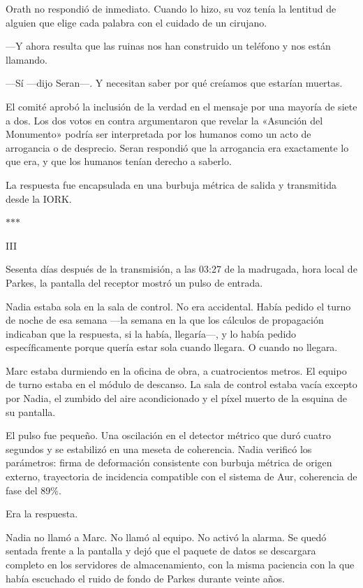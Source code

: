 \documentclass[11pt,a5paper,twoside]{book}
\begin{document}
Orath no respondió de inmediato. Cuando lo hizo, su voz tenía la lentitud de alguien que elige cada palabra con el cuidado de un cirujano.

—Y ahora resulta que las ruinas nos han construido un teléfono y nos están llamando.

—Sí —dijo Seran—. Y necesitan saber por qué creíamos que estarían muertas.

El comité aprobó la inclusión de la verdad en el mensaje por una mayoría de siete a dos. Los dos votos en contra argumentaron que revelar la «Asunción del Monumento» podría ser interpretada por los humanos como un acto de arrogancia o de desprecio. Seran respondió que la arrogancia era exactamente lo que era, y que los humanos tenían derecho a saberlo.

La respuesta fue encapsulada en una burbuja métrica de salida y transmitida desde la IORK.

\vspace{1.5em}
\begin{center}$\ast$\quad$\ast$\quad$\ast$\end{center}
\vspace{1.5em}

III

Sesenta días después de la transmisión, a las 03:27 de la madrugada, hora local de Parkes, la pantalla del receptor mostró un pulso de entrada.

Nadia estaba sola en la sala de control. No era accidental. Había pedido el turno de noche de esa semana —la semana en la que los cálculos de propagación indicaban que la respuesta, si la había, llegaría—, y lo había pedido específicamente porque quería estar sola cuando llegara. O cuando no llegara.

Marc estaba durmiendo en la oficina de obra, a cuatrocientos metros. El equipo de turno estaba en el módulo de descanso. La sala de control estaba vacía excepto por Nadia, el zumbido del aire acondicionado y el píxel muerto de la esquina de su pantalla.

El pulso fue pequeño. Una oscilación en el detector métrico que duró cuatro segundos y se estabilizó en una meseta de coherencia. Nadia verificó los parámetros: firma de deformación consistente con burbuja métrica de origen externo, trayectoria de incidencia compatible con el sistema de Aur, coherencia de fase del 89\%.

Era la respuesta.

Nadia no llamó a Marc. No llamó al equipo. No activó la alarma. Se quedó sentada frente a la pantalla y dejó que el paquete de datos se descargara completo en los servidores de almacenamiento, con la misma paciencia con la que había escuchado el ruido de fondo de Parkes durante veinte años.
\end{document}
